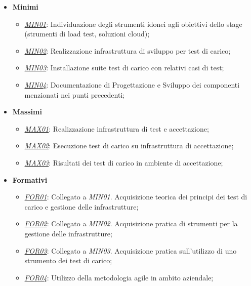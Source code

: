 \begin{itemize}
	\item \textbf{Minimi}
	\begin{itemize}
		\item \underline{\textit{MIN01}}: Individuazione degli strumenti idonei agli obiettivi dello stage (strumenti di load test, soluzioni \gls{cloud});
		\item \underline{\textit{MIN02}}: Realizzazione infrastruttura di sviluppo per test di carico;
		\item \underline{\textit{MIN03}}: Installazione suite test di carico con relativi casi di test;
		\item \underline{\textit{MIN04}}: Documentazione di Progettazione e Sviluppo dei componenti menzionati nei punti precedenti;
	\end{itemize}
	\item \textbf{Massimi}
	\begin{itemize}
		\item \underline{\textit{MAX01}}: Realizzazione infrastruttura di test e accettazione;
		\item \underline{\textit{MAX02}}: Esecuzione test di carico su infrastruttura di accettazione;
		\item \underline{\textit{MAX03}}: Risultati dei test di carico in ambiente di accettazione; 
	\end{itemize}
	\item \textbf{Formativi}
	\begin{itemize}
		\item \underline{\textit{FOR01}}: Collegato a \textit{MIN01}. Acquisizione teorica dei principi dei test di carico e gestione delle infrastrutture;
		\item \underline{\textit{FOR02}}: Collegato a \textit{MIN02}. Acquisizione pratica di strumenti per la gestione delle infrastrutture;
		\item \underline{\textit{FOR03}}: Collegato a \textit{MIN03}. Acquisizione pratica sull'utilizzo di uno strumento dei test di carico;
		\item \underline{\textit{FOR04}}: Utilizzo della metodologia \gls{agile} in ambito aziendale;		
	\end{itemize}
\end{itemize}
